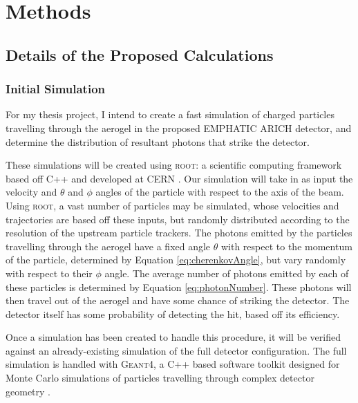 
\chapter{Methods}
\label{ch:Methods}

\section{Details of the Proposed Calculations} 
\subsection{Initial Simulation}
\label{sec:experiment}
For my thesis project, I intend to create a fast simulation of charged particles travelling through the aerogel in the proposed EMPHATIC ARICH detector, and determine the distribution of resultant photons that strike the detector. 

These simulations will be created using \textsc{root}: a scientific computing framework based off C++ and developed at CERN \cite{root}. Our simulation will take in as input the velocity and $\theta$ and $\phi$ angles of the particle with respect to the axis of the beam. Using \textsc{root}, a vast number of particles may be simulated, whose velocities and trajectories are based off these inputs, but randomly distributed according to the resolution of the upstream particle trackers. The photons emitted by the particles travelling through the aerogel have a fixed angle $\theta$ with respect to the momentum of the particle, determined by Equation \ref{eq:cherenkovAngle}, but vary randomly with respect to their $\phi$ angle. The average number of photons emitted by each of these particles is determined by Equation \ref{eq:photonNumber}. These photons will then travel out of the aerogel and have some chance of striking the detector. The detector itself has some probability of detecting the hit, based off its efficiency. 

Once a simulation has been created to handle this procedure, it will be verified against an already-existing simulation of the full detector configuration. The full simulation is handled with \textsc{Geant4}, a C++ based software toolkit designed for Monte Carlo simulations of particles travelling through complex detector geometry  \cite{geant4}.

